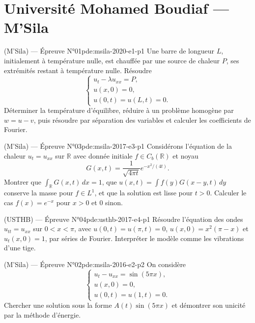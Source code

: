 \section{Université Mohamed Boudiaf --- M'Sila}
\begin{problem}{(M'Sila) — Épreuve N°01}{pde:msila-2020-e1-p1}
Une barre de longueur $L$, initialement à température nulle, est chauffée par une source de chaleur $P$, ses extrémités restant à température nulle. Résoudre
$$\begin{cases}u_t-\lambda u_{xx}=P,\\u(x,0)=0,\\u(0,t)=u(L,t)=0.\end{cases}$$
Déterminer la température d'équilibre, réduire à un problème homogène par $w=u-v$, puis résoudre par séparation des variables et calculer les coefficients de Fourier.
\end{problem}
\newpage
\begin{problem}{(M'Sila) — Épreuve N°03}{pde:msila-2017-e3-p1}
Considérons l'équation de la chaleur $u_t=u_{xx}$ sur $\mathbb R$ avec donnée initiale $f\in C_b(\mathbb R)$ et noyau
$$G(x,t)=\frac1{\sqrt{4\pi t}}e^{-x^2/(4t)}.$$
Montrer que $\int_\mathbb R G(x,t)\,dx=1$, que $u(x,t)=\int f(y)G(x-y,t)\,dy$ conserve la masse pour $f\in L^1$, et que la solution est lisse pour $t>0$. Calculer le cas $f(x)=e^{-x}$ pour $x>0$ et $0$ sinon.
\end{problem}
\newpage
\begin{problem}{(USTHB) — Épreuve N°04}{pde:usthb-2017-e4-p1}
Résoudre l'équation des ondes $u_{tt}=u_{xx}$ sur $0<x<\pi$, avec $u(0,t)=u(\pi,t)=0$, $u(x,0)=x^2(\pi-x)$ et $u_t(x,0)=1$, par séries de Fourier. Interpréter le modèle comme les vibrations d'une tige.
\end{problem}
\newpage
\begin{problem}{(M'Sila) — Épreuve N°02}{pde:msila-2016-e2-p2}
On considère
$$\begin{cases}u_t-u_{xx}=\sin(5\pi x),\\u(x,0)=0,\\u(0,t)=u(1,t)=0.\end{cases}$$
Chercher une solution sous la forme $A(t)\sin(5\pi x)$ et démontrer son unicité par la méthode d'énergie.
\end{problem}
